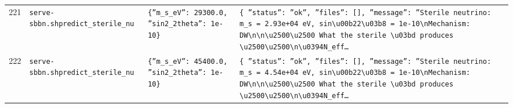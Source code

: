 \documentclass[11pt,a4paper]{article}
\begin{document}
\begin{longtable}{@{}p{}p{}p{}p{}@{}}
221 & \texttt{serve-sbbn.sh}\newline\texttt{predict\_\allowbreak{}sterile\_\allowbreak{}nu} & \texttt{\{''m\_\allowbreak{}s\_\allowbreak{}eV'':\allowbreak{} 29300.0,\allowbreak{} ''sin2\_\allowbreak{}2theta'':\allowbreak{} 1e-10\}\allowbreak{}} & \texttt{\{   ''status'':\allowbreak{} ''ok'',\allowbreak{}   ''files'':\allowbreak{} []\allowbreak{},\allowbreak{}   ''message'':\allowbreak{} ''Sterile neutrino:\allowbreak{} m\_\allowbreak{}s =\allowbreak{} 2.93e+04 eV,\allowbreak{} sin\textbackslash{}\allowbreak{}u00b22\textbackslash{}\allowbreak{}u03b8 =\allowbreak{} 1e-10\textbackslash{}\allowbreak{}nMechanism:\allowbreak{} DW\textbackslash{}\allowbreak{}n\textbackslash{}\allowbreak{}n\textbackslash{}\allowbreak{}u2500\textbackslash{}\allowbreak{}u2500 What the sterile \textbackslash{}\allowbreak{}u03bd produces \textbackslash{}\allowbreak{}u2500\textbackslash{}\allowbreak{}u2500\textbackslash{}\allowbreak{}n\textbackslash{}\allowbreak{}u0394N\_\allowbreak{}eff\ldots{}\allowbreak{}} \\
222 & \texttt{serve-sbbn.sh}\newline\texttt{predict\_\allowbreak{}sterile\_\allowbreak{}nu} & \texttt{\{''m\_\allowbreak{}s\_\allowbreak{}eV'':\allowbreak{} 45400.0,\allowbreak{} ''sin2\_\allowbreak{}2theta'':\allowbreak{} 1e-10\}\allowbreak{}} & \texttt{\{   ''status'':\allowbreak{} ''ok'',\allowbreak{}   ''files'':\allowbreak{} []\allowbreak{},\allowbreak{}   ''message'':\allowbreak{} ''Sterile neutrino:\allowbreak{} m\_\allowbreak{}s =\allowbreak{} 4.54e+04 eV,\allowbreak{} sin\textbackslash{}\allowbreak{}u00b22\textbackslash{}\allowbreak{}u03b8 =\allowbreak{} 1e-10\textbackslash{}\allowbreak{}nMechanism:\allowbreak{} DW\textbackslash{}\allowbreak{}n\textbackslash{}\allowbreak{}n\textbackslash{}\allowbreak{}u2500\textbackslash{}\allowbreak{}u2500 What the sterile \textbackslash{}\allowbreak{}u03bd produces \textbackslash{}\allowbreak{}u2500\textbackslash{}\allowbreak{}u2500\textbackslash{}\allowbreak{}n\textbackslash{}\allowbreak{}u0394N\_\allowbreak{}eff\ldots{}\allowbreak{}} \\

\end{longtable}
\end{document}
